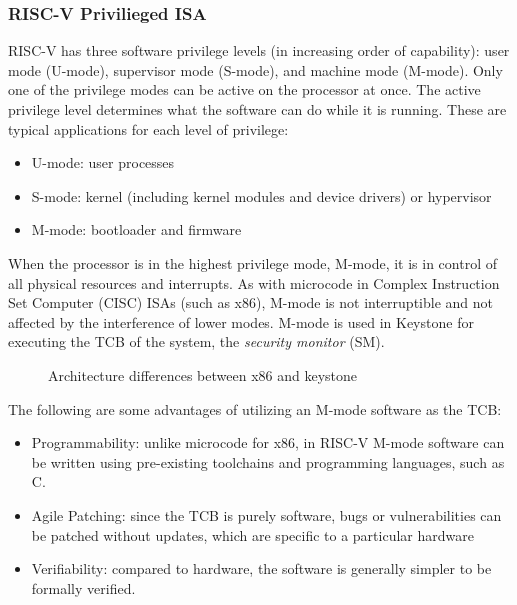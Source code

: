 \subsubsection{RISC-V Privilieged ISA}
RISC-V \cite{risc-v-spec} has three software privilege levels (in increasing order of capability): user mode (U-mode), supervisor mode (S-mode), and machine mode (M-mode). Only one of the privilege modes can be active on the processor at once.
The active privilege level determines what the software can do while it is running. These are typical applications for each level of privilege:
\begin{itemize}
    \item U-mode: user processes 
    \item S-mode: kernel (including kernel modules and device drivers) or hypervisor
    \item M-mode: bootloader and firmware
\end{itemize}
When the processor is in the highest privilege mode, M-mode, it is in control of all physical resources and interrupts. As with microcode in Complex Instruction Set Computer (CISC) ISAs (such as x86), M-mode is not interruptible and not affected by the interference of lower modes. M-mode is used in Keystone for executing the TCB of the system, the \textit{security monitor} (SM).
\begin{figure}[h!]
    \centering
    
    \caption{Architecture differences between x86 and keystone}
    \label{keystone-vs-x86}
\end{figure}
The following are some advantages of utilizing an M-mode software as the TCB:
\begin{itemize}
    \item Programmability: unlike microcode for x86, in RISC-V M-mode software can be written using pre-existing toolchains and programming languages, such as C. 
    \item Agile Patching: since the TCB is purely software, bugs or vulnerabilities can be patched without updates, which are specific to a particular hardware 
    \item Verifiability: compared to hardware, the software is generally simpler to be formally verified.
\end{itemize}

